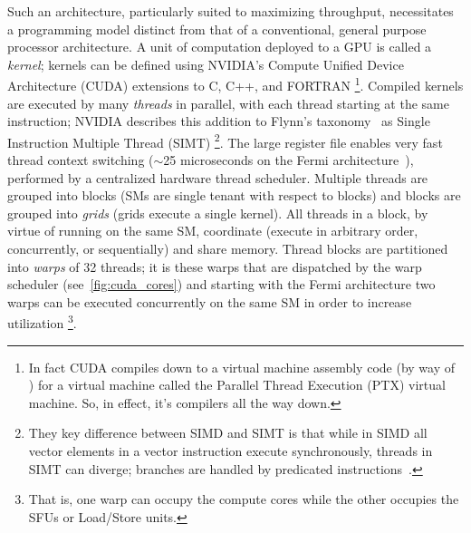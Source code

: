 Such an architecture, particularly suited to maximizing throughput, necessitates a programming model distinct from that of a conventional, general purpose processor architecture.
A unit of computation deployed to a GPU is called a \textit{kernel}; kernels can be defined using NVIDIA's Compute Unified Device Architecture (CUDA) extensions to C, C++, and FORTRAN%
\footnote{In fact CUDA compiles down to a virtual machine assembly code (by way of ) for a virtual machine called the Parallel Thread Execution (PTX) virtual machine. So, in effect, it's compilers all the way down.}.
Compiled kernels are executed by many \textit{threads} in parallel, with each thread starting at the same instruction;
NVIDIA describes this addition to Flynn's taxonomy~\cite{5009071} as Single Instruction Multiple Thread (SIMT)%
\footnote{They key difference between SIMD and SIMT is that while in SIMD all vector elements in a vector instruction execute synchronously, threads in SIMT can diverge; branches are handled by predicated instructions~\cite{cuda_toolkit}.}.
The large register file enables very fast thread context switching ($\sim$25 microseconds on the Fermi architecture~\cite{Glaskowsky2009NVIDIAS}), performed by a centralized hardware thread scheduler.
Multiple threads are grouped into blocks (SMs are single tenant with respect to blocks) and blocks are grouped into \textit{grids} (grids execute a single kernel).
All threads in a block, by virtue of running on the same SM, coordinate (execute in arbitrary order, concurrently, or sequentially) and share memory.
Thread blocks are partitioned into \textit{warps} of 32 threads;
it is these warps that are dispatched by the warp scheduler (see~\cref{fig:cuda_cores}) and starting with the Fermi architecture two warps can be executed concurrently on the same SM in order to increase utilization%
\footnote{That is, one warp can occupy the compute cores while the other occupies the SFUs or Load/Store units.}.



